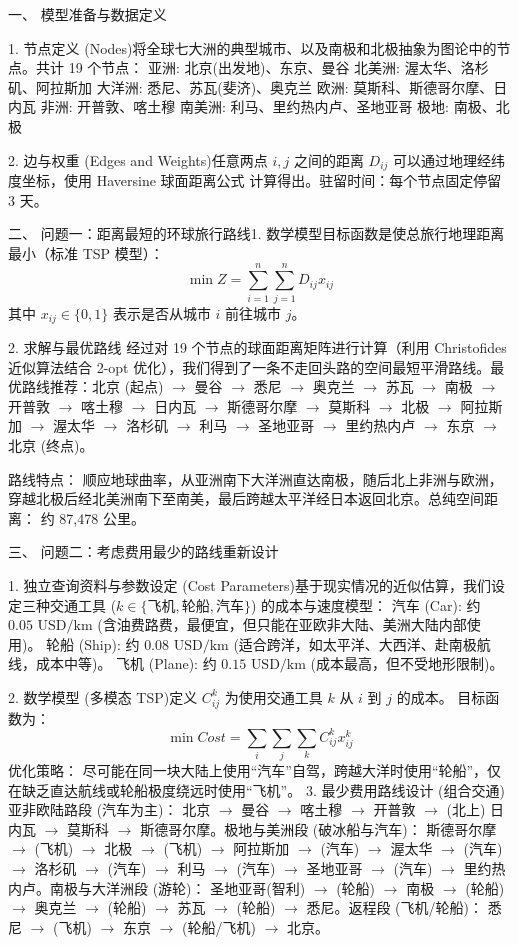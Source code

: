 一、 模型准备与数据定义

1. 节点定义 (Nodes)将全球七大洲的典型城市、以及南极和北极抽象为图论中的节点。共计 19 个节点：
亚洲: 北京(出发地)、东京、曼谷
北美洲: 渥太华、洛杉矶、阿拉斯加
大洋洲: 悉尼、苏瓦(斐济)、奥克兰
欧洲: 莫斯科、斯德哥尔摩、日内瓦
非洲: 开普敦、喀土穆
南美洲: 利马、里约热内卢、圣地亚哥
极地: 南极、北极

2. 边与权重 (Edges and Weights)任意两点 $i, j$ 之间的距离 $D_{ij}$ 可以通过地理经纬度坐标，使用 Haversine 球面距离公式 计算得出。驻留时间：每个节点固定停留 3 天。

二、 问题一：距离最短的环球旅行路线1. 数学模型目标函数是使总旅行地理距离最小（标准 TSP 模型）：$$\min Z = \sum_{i=1}^{n}\sum_{j=1}^{n} D_{ij} x_{ij}$$
其中 $x_{ij} \in \{0, 1\}$ 表示是否从城市 $i$ 前往城市 $j$。

2. 求解与最优路线
经过对 19 个节点的球面距离矩阵进行计算（利用 Christofides 近似算法结合 2-opt 优化），我们得到了一条不走回头路的空间最短平滑路线。最优路线推荐：北京 (起点) $\rightarrow$ 曼谷 $\rightarrow$ 悉尼 $\rightarrow$ 奥克兰 $\rightarrow$ 苏瓦 $\rightarrow$ 南极 $\rightarrow$ 开普敦 $\rightarrow$ 喀土穆 $\rightarrow$ 日内瓦 $\rightarrow$ 斯德哥尔摩 $\rightarrow$ 莫斯科 $\rightarrow$ 北极 $\rightarrow$ 阿拉斯加 $\rightarrow$ 渥太华 $\rightarrow$ 洛杉矶 $\rightarrow$ 利马 $\rightarrow$ 圣地亚哥 $\rightarrow$ 里约热内卢 $\rightarrow$ 东京 $\rightarrow$ 北京 (终点)。

路线特点： 顺应地球曲率，从亚洲南下大洋洲直达南极，随后北上非洲与欧洲，穿越北极后经北美洲南下至南美，最后跨越太平洋经日本返回北京。总纯空间距离： 约 87,478 公里。

三、 问题二：考虑费用最少的路线重新设计

1. 独立查询资料与参数设定 (Cost Parameters)基于现实情况的近似估算，我们设定三种交通工具 ($k \in \{飞机, 轮船, 汽车\}$) 的成本与速度模型：
汽车 (Car): 约 $0.05 \text{ USD/km}$ (含油费路费，最便宜，但只能在亚欧非大陆、美洲大陆内部使用)。
轮船 (Ship): 约 $0.08 \text{ USD/km}$ (适合跨洋，如太平洋、大西洋、赴南极航线，成本中等)。
飞机 (Plane): 约 $0.15 \text{ USD/km}$ (成本最高，但不受地形限制)。

2. 数学模型 (多模态 TSP)定义 $C_{ij}^k$ 为使用交通工具 $k$ 从 $i$ 到 $j$ 的成本。
目标函数为：$$\min Cost = \sum_{i}\sum_{j}\sum_{k} C_{ij}^k x_{ij}^k$$
优化策略： 尽可能在同一块大陆上使用“汽车”自驾，跨越大洋时使用“轮船”，仅在缺乏直达航线或轮船极度绕远时使用“飞机”。
3. 最少费用路线设计 (组合交通)亚非欧陆路段 (汽车为主)： 北京 $\rightarrow$ 曼谷 $\rightarrow$ 喀土穆 $\rightarrow$ 开普敦 $\rightarrow$ (北上) 日内瓦 $\rightarrow$ 莫斯科 $\rightarrow$ 斯德哥尔摩。极地与美洲段 (破冰船与汽车)： 斯德哥尔摩 $\rightarrow$ (飞机) $\rightarrow$ 北极 $\rightarrow$ (飞机) $\rightarrow$ 阿拉斯加 $\rightarrow$ (汽车) $\rightarrow$ 渥太华 $\rightarrow$ (汽车) $\rightarrow$ 洛杉矶 $\rightarrow$ (汽车) $\rightarrow$ 利马 $\rightarrow$ (汽车) $\rightarrow$ 圣地亚哥 $\rightarrow$ (汽车) $\rightarrow$ 里约热内卢。南极与大洋洲段 (游轮)： 圣地亚哥(智利) $\rightarrow$ (轮船) $\rightarrow$ 南极 $\rightarrow$ (轮船) $\rightarrow$ 奥克兰 $\rightarrow$ (轮船) $\rightarrow$ 苏瓦 $\rightarrow$ (轮船) $\rightarrow$ 悉尼。返程段 (飞机/轮船)： 悉尼 $\rightarrow$ (飞机) $\rightarrow$ 东京 $\rightarrow$ (轮船/飞机) $\rightarrow$ 北京。

